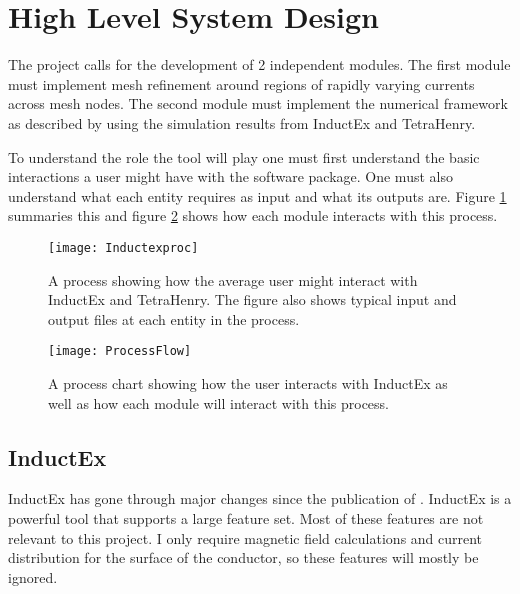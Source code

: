 \section{High Level System Design}
The project calls for the development of 2 independent modules. The first module must implement mesh refinement around regions of rapidly varying currents across mesh nodes. The second module must implement the numerical framework as described by \cite{fluxNoiseSquidsStevenAnton} using the simulation results from InductEx and TetraHenry. \par
To understand the role the tool will play one must first understand the basic interactions a user might have with the software package. One must also understand what each entity requires as input and what its outputs are. Figure \ref{fig:Inductexproc} summaries this and figure \ref{fig:ProcessFlow} shows how each module interacts with this process.
\begin{figure}[h]
    \centering
    \texttt{[image: Inductexproc]}
    \caption{A process showing how the average user might interact with InductEx and TetraHenry. The figure also shows typical input and output files at each entity in the process.}
    \label{fig:Inductexproc}
\end{figure}
\begin{figure}[h]
    \centering
    \texttt{[image: ProcessFlow]}
    \caption{A process chart showing how the user interacts with InductEx as well as how each module will interact with this process.}
    \label{fig:ProcessFlow}
\end{figure}

\subsection{InductEx}
InductEx has gone through major changes since the publication of \cite{fluxNoiseSquidsStevenAnton}. InductEx is a powerful tool that supports a large feature set. Most of these features are not relevant to this project. I only require magnetic field calculations and current distribution for the surface of the conductor, so these features will mostly be ignored.

